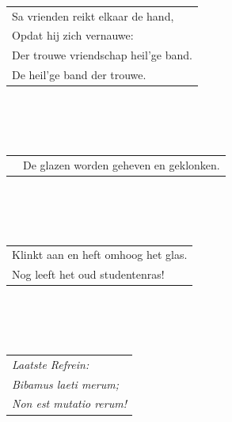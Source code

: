 \documentclass[a4paper, 14pt]{extarticle}
\begin{document}
\\\\\\
\begin{tabularx}{0.7\textwidth} {
   >{\raggedright\arraybackslash}X }
Sa vrienden reikt elkaar de hand,\\
Opdat hij zich vernauwe:\\
Der trouwe vriendschap heil’ge band.\\
De heil’ge band der trouwe.\\
\end{tabularx}
\\\\\\
\begin{tabularx}{\textwidth} {
   c >{\raggedright\arraybackslash}X}
    \hspace{5mm} & {\small De glazen worden geheven en geklonken.}\\
\end{tabularx}
\\\\\\
\begin{tabularx}{0.7\textwidth} {
   >{\raggedright\arraybackslash}X }
Klinkt aan en heft omhoog het glas. \\
Nog leeft het oud studentenras!\\
\end{tabularx}
\\\\\\
\begin{tabularx}{0.7\textwidth} {
   >{\raggedright\arraybackslash}X }
\textit{Laatste Refrein:}\\
\textit{Bibamus laeti merum;} \\
\textit{Non est mutatio rerum!} \\
\end{tabularx}
\end{document}
